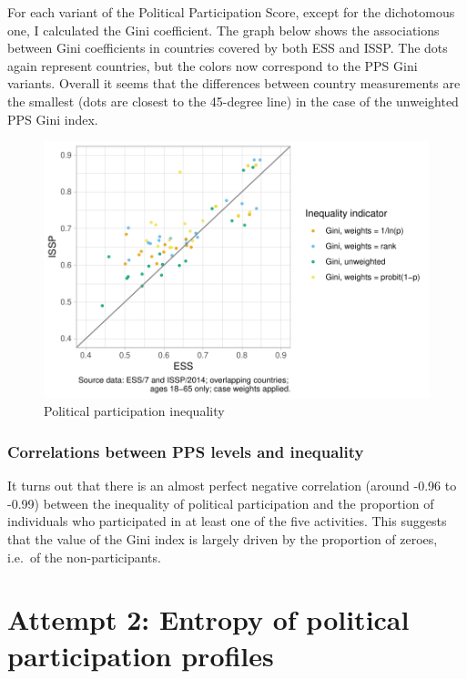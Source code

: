 \documentclass[12pt,]{article}
\begin{document}
For each variant of the Political Participation Score, except for the dichotomous one, I calculated the Gini coefficient. The graph below shows the associations between Gini coefficients in countries covered by both ESS and ISSP. The dots again represent countries, but the colors now correspond to the PPS Gini variants. Overall it seems that the differences between country measurements are the smallest (dots are closest to the 45-degree line) in the case of the unweighted PPS Gini index.

\begin{figure}[H]

{\centering \includegraphics{report_files/figure-latex/part-gini-dot-plot-1} 

}

\caption{Political participation inequality}\label{fig:part-gini-dot-plot}
\end{figure}

\hypertarget{correlations-between-pps-levels-and-inequality}{%
\subsubsection{Correlations between PPS levels and inequality}\label{correlations-between-pps-levels-and-inequality}}

It turns out that there is an almost perfect negative correlation (around -0.96 to -0.99) between the inequality of political participation and the proportion of individuals who participated in at least one of the five activities. This suggests that the value of the Gini index is largely driven by the proportion of zeroes, i.e.~of the non-participants.

\hypertarget{attempt-2-entropy-of-political-participation-profiles}{%
\section{Attempt 2: Entropy of political participation profiles}\label{attempt-2-entropy-of-political-participation-profiles}}
\end{document}

